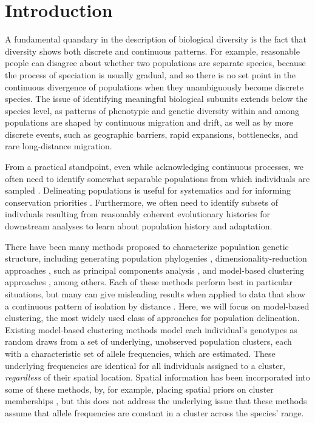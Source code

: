 \documentclass[12pt]{article}
\begin{document}
\section*{Introduction}
A fundamental quandary in the description of biological diversity is
the fact that diversity shows both discrete and continuous patterns. 
For example, reasonable people can disagree about whether two 
populations are separate species, because the 
process of speciation is usually gradual, and so there is no set point
in the continuous divergence of populations when they unambiguously become discrete species.
The issue of identifying meaningful biological subunits 
extends below the species level, as patterns of phenotypic
and genetic diversity within and among populations are shaped
by continuous migration and drift, as well as by more discrete events, 
such as geographic barriers, rapid expansions, bottlenecks, and rare
long-distance migration. 

From a practical standpoint, even while acknowledging continuous
processes, we often need to identify somewhat separable populations 
from which individuals are sampled \citep{wright1949genetical}.
Delineating populations is useful for systematics and for
informing conservation priorities \citep{Moritz1994,Waples_1998,Moritz_etal_2002}.
Furthermore, we often need to identify subsets of indivduals resulting from reasonably coherent
evolutionary histories for downstream analyses to learn about population history and adaptation. 

There have been many methods proposed to characterize population
genetic structure,
including generating population phylogenies \citep{CavalliSforza1975, treemix},
dimensionality-reduction approaches \citep{meirmans2009genodive}, 
such as principal components analysis 
\citep{menozzi1978synthetic,novembre_interpreting_2008, price2006eigenstrat},
and model-based clustering approaches 
\citep[e.g.][]{STRUCTURE, falush2003, hubisz2009,ADMIXTURE, 
FINESTRUCTURE, fastStructure, huelsenbeck2007inference, 
Corander2003,TESS,geneland}, among others.
Each of these methods perform best in particular situations,
but many can give misleading results when applied to data 
that show a continuous pattern of isolation by distance 
\citep{Wright1943, novembre_interpreting_2008, Frantz2009}.
Here, we will focus on model-based clustering, the most widely used class of approaches for population delineation.
Existing model-based clustering methods model each individual's genotypes 
as random draws from a set of underlying, unobserved population clusters, 
each with a characteristic set of allele frequencies, which are estimated. 
These underlying frequencies are identical 
for all individuals assigned to a cluster, 
\emph{regardless} of their spatial location. 
Spatial information has been incorporated into some of these methods, 
by, for example, placing spatial priors on cluster memberships \citep{geneland,TESS}, 
but this does not address the underlying issue that 
these methods assume that allele frequencies 
are constant in a cluster across the species' range.  
\end{document}
